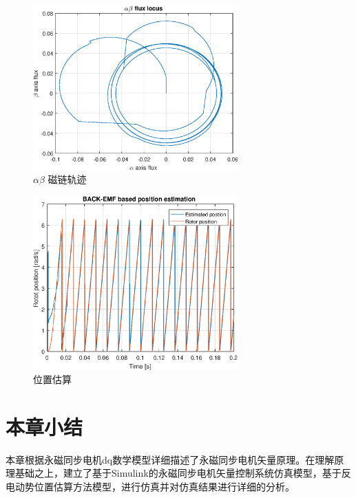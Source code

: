 \begin{figure}[H]
	\centering
	\includegraphics[width=0.7\textwidth]{figs/flux.eps}
	\caption{$\alpha\beta$ 磁链轨迹}
	\label{fig:flux}
\end{figure}
\begin{figure}[H]
	\centering
	\includegraphics[width=0.7\textwidth]{figs/position_estimation.eps}
	\caption{位置估算}
	\label{fig:position_estimation}
\end{figure}
\section{本章小结}
本章根据永磁同步电机dq数学模型详细描述了永磁同步电机矢量原理。在理解原理基础之上，建立了基于Simulink的永磁同步电机矢量控制系统仿真模型，基于反电动势位置估算方法模型，进行仿真并对仿真结果进行详细的分析。